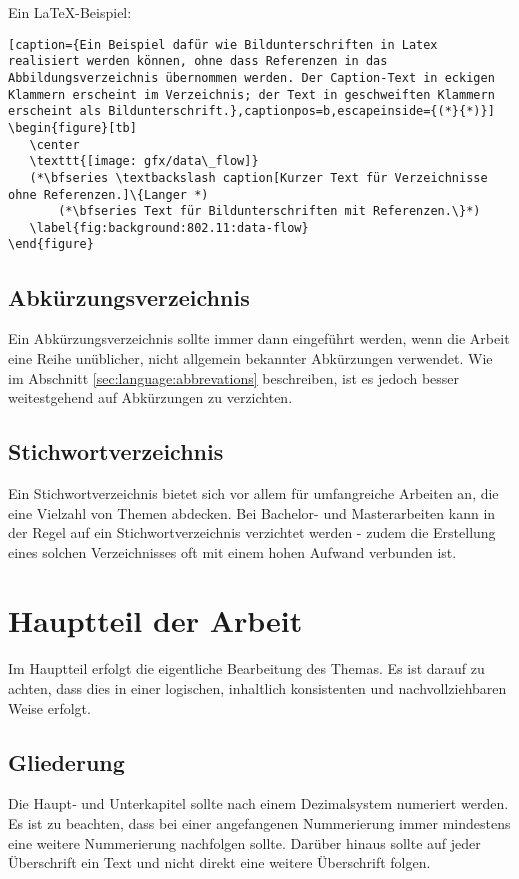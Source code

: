 Ein \LaTeX-Beispiel:
%
\begin{lstlisting}[caption={Ein Beispiel dafür wie Bildunterschriften in Latex realisiert werden können, ohne dass Referenzen in das Abbildungsverzeichnis übernommen werden. Der Caption-Text in eckigen Klammern erscheint im Verzeichnis; der Text in geschweiften Klammern erscheint als Bildunterschrift.},captionpos=b,escapeinside={(*}{*)}]
\begin{figure}[tb]
   \center
   \texttt{[image: gfx/data\_flow]}
   (*\bfseries \textbackslash caption[Kurzer Text für Verzeichnisse ohne Referenzen.]\{Langer *)
       (*\bfseries Text für Bildunterschriften mit Referenzen.\}*)
   \label{fig:background:802.11:data-flow}
\end{figure}
\end{lstlisting}

\subsection{Abkürzungsverzeichnis}\label{sec:structure:tables:abrev}
%
Ein Abkürzungsverzeichnis sollte immer dann eingeführt werden, wenn die Arbeit eine Reihe unüblicher, nicht allgemein bekannter Abkürzungen verwendet. Wie im Abschnitt \ref{sec:language:abbrevations} beschreiben, ist es jedoch besser weitestgehend auf Abkürzungen zu verzichten.

\subsection{Stichwortverzeichnis}\label{sec:structure:tables:index}
%
Ein Stichwortverzeichnis bietet sich vor allem für umfangreiche Arbeiten an, die eine Vielzahl von Themen abdecken. Bei Bachelor- und Masterarbeiten kann in der Regel auf ein Stichwortverzeichnis verzichtet werden - zudem die Erstellung eines solchen Verzeichnisses oft mit einem hohen Aufwand verbunden ist.

\section{Hauptteil der Arbeit}\label{sec:structure:main}
%
Im Hauptteil erfolgt die eigentliche Bearbeitung des Themas. Es ist darauf zu achten, dass dies in einer logischen, inhaltlich konsistenten und nachvollziehbaren Weise erfolgt.

\subsection{Gliederung}\label{sec:structure:main:structure}
%
Die Haupt‑ und Unterkapitel sollte nach einem Dezimalsystem numeriert werden. Es ist zu beachten, dass bei einer angefangenen Nummerierung immer mindestens eine weitere Nummerierung nachfolgen sollte. Darüber hinaus sollte auf jeder Überschrift ein Text  und nicht direkt eine weitere Überschrift folgen.

